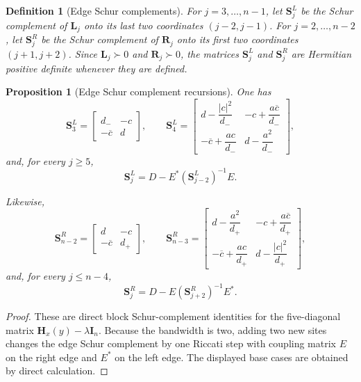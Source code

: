 \documentclass[11pt]{article}
\newtheorem{proposition}[theorem]{Proposition}
\newtheorem{definition}[theorem]{Definition}
\begin{document}
\begin{definition}[Edge Schur complements]\label{def:edge-schur-complements}
For \(j=3,\dots,n-1\), let \(\mathbf S_j^L\) be the Schur complement of \(\mathbf L_j\) onto its last two coordinates \((j-2,j-1)\). For \(j=2,\dots,n-2\), let \(\mathbf S_j^R\) be the Schur complement of \(\mathbf R_j\) onto its first two coordinates \((j+1,j+2)\). Since \(\mathbf L_j\succ0\) and \(\mathbf R_j\succ0\), the matrices \(\mathbf S_j^L\) and \(\mathbf S_j^R\) are Hermitian positive definite whenever they are defined.
\end{definition}

\begin{proposition}[Edge Schur complement recursions]\label{prop:edge-schur-recursions}
One has
\[
\mathbf S_3^L=
\begin{bmatrix}
d_- & -c\\
-\overline c & d
\end{bmatrix},
\qquad
\mathbf S_4^L=
\begin{bmatrix}
d-\dfrac{|c|^2}{d_-} & -c+\dfrac{a\overline c}{d_-}\\[3mm]
-\overline c+\dfrac{ac}{d_-} & d-\dfrac{a^2}{d_-}
\end{bmatrix},
\]
and, for every \(j\ge 5\),
\[
\boxed{
\mathbf S_j^L
=
D-E^*(\mathbf S_{j-2}^L)^{-1}E.
}
\]

Likewise,
\[
\mathbf S_{n-2}^R=
\begin{bmatrix}
d & -c\\
-\overline c & d_+
\end{bmatrix},
\qquad
\mathbf S_{n-3}^R=
\begin{bmatrix}
d-\dfrac{a^2}{d_+} & -c+\dfrac{a\overline c}{d_+}\\[3mm]
-\overline c+\dfrac{ac}{d_+} & d-\dfrac{|c|^2}{d_+}
\end{bmatrix},
\]
and, for every \(j\le n-4\),
\[
\boxed{
\mathbf S_j^R
=
D-E(\mathbf S_{j+2}^R)^{-1}E^*.
}
\]
\end{proposition}

\begin{proof}
These are direct block Schur-complement identities for the five-diagonal matrix
\(\mathbf H_x(y)-\lambda\mathbf I_n\). Because the bandwidth is two, adding two new sites changes the edge Schur complement by one Riccati step with coupling matrix \(E\) on the right edge and \(E^*\) on the left edge. The displayed base cases are obtained by direct calculation.
\end{proof}
\end{document}
